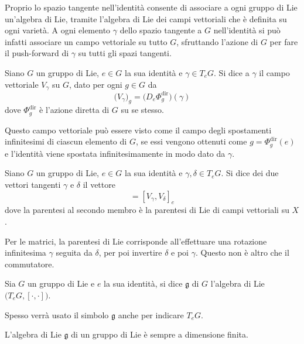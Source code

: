 Proprio lo spazio tangente nell'identità consente di associare a ogni gruppo di Lie un'algebra di Lie, tramite l'algebra di Lie dei campi vettoriali che è definita su ogni varietà. A ogni elemento $\gamma$ dello spazio tangente a $G$ nell'identità si può infatti associare un campo vettoriale su tutto $G$, sfruttando l'azione di $G$ per fare il push-forward di $\gamma$ su tutti gli spazi tangenti.
\begin{definition}
  Siano $G$ un gruppo di Lie, $e \in G$ la sua identità e $\gamma \in T_e G$. Si dice  a $\gamma$ il campo vettoriale $V_\gamma$ su $G$, dato per ogni $g \in G$ da \begin{equation*}
  \big(V_\gamma\big)_g = \big(D_e \Phi^{\text{dir}}_g\big) (\gamma)
  \end{equation*} 
  dove $\Phi^{\text{dir}}_g$ è l'azione diretta di $G$ su se stesso.
\end{definition}
\begin{remark}
  Questo campo vettoriale può essere visto come il campo degli spostamenti infinitesimi di ciascun elemento di $G$, se essi vengono ottenuti come $g=\Phi^{\text{dir}}_g(e)$ e l'identità viene spostata infinitesimamente in modo dato da $\gamma$.
\end{remark}
\begin{definition}
  Siano $G$ un gruppo di Lie, $e \in G$ la sua identità e $\gamma, \delta \in T_e G$. Si dice  dei due vettori tangenti $\gamma$ e $\delta$ il vettore \begin{equation*}
  [\gamma,\delta] = [V_{\gamma}, V_{\delta}]_e
  \end{equation*} 
  dove la parentesi al secondo membro è la parentesi di Lie di campi vettoriali su $X$.
\end{definition}
\begin{remark}
  Per le matrici, la parentesi di Lie corrisponde all'effettuare una rotazione infinitesima $\gamma$ seguita da $\delta$, per poi invertire $\delta$ e poi $\gamma$. Questo non è altro che il commutatore.
\end{remark}
\begin{definition}
  Sia $G$ un gruppo di Lie e $e$ la sua identità, si dice  $\mathfrak{g}$ di $G$ l'algebra di Lie $\big(T_e G, [\cdot ,\cdot ]\big)$.
\end{definition}
\begin{remark}
  Spesso verrà usato il simbolo $\mathfrak{g}$ anche per indicare $T_e G$.
\end{remark}
\begin{theorem}
  L'algebra di Lie $\mathfrak{g}$ di un gruppo di Lie è sempre a dimensione finita.
\end{theorem}

